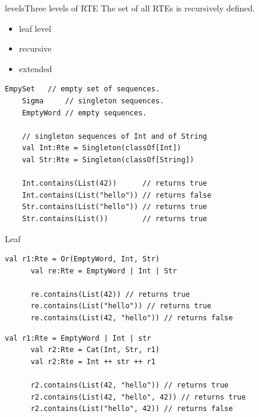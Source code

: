 \begin{frame}{levels}{Three levels of RTE}
  The set of all RTEs is recursively defined.
  \begin{itemize}
  \item leaf level
  \item recursive
  \item extended
  \end{itemize}
\end{frame}

\newsavebox\leafbox
\begin{lrbox}{\leafbox}
  \begin{minipage}{12cm}
    \begin{lstlisting}[style=scalaioScala]
    EmpySet   // empty set of sequences.
    Sigma     // singleton sequences.
    EmptyWord // empty sequences.

    // singleton sequences of Int and of String
    val Int:Rte = Singleton(classOf[Int])    
    val Str:Rte = Singleton(classOf[String])

    Int.contains(List(42))      // returns true
    Int.contains(List("hello")) // returns false
    Str.contains(List("hello")) // returns true
    Str.contains(List())        // returns true
    \end{lstlisting}
  \end{minipage}
\end{lrbox}

\begin{frame}{Leaf}
  \usebox\leafbox
\end{frame}

\newsavebox\orbox
\begin{lrbox}{\orbox}
  \begin{minipage}{12cm}
    \begin{lstlisting}[style=scalaioScala]
      val r1:Rte = Or(EmptyWord, Int, Str)
      val re:Rte = EmptyWord | Int | Str
      
      re.contains(List(42)) // returns true
      re.contains(List("hello")) // returns true
      re.contains(List(42, "hello")) // returns false

    \end{lstlisting}
  \end{minipage}
\end{lrbox}

\newsavebox\catbox
\begin{lrbox}{\catbox}
  \begin{minipage}{12cm}
    \begin{lstlisting}[style=scalaioScala]
      val r1:Rte = EmptyWord | Int | str
      val r2:Rte = Cat(Int, Str, r1)
      val r2:Rte = Int ++ str ++ r1

      r2.contains(List(42, "hello")) // returns true
      r2.contains(List(42, "hello", 42)) // returns true
      r2.contains(List("hello", 42)) // returns false
    \end{lstlisting}
  \end{minipage}
\end{lrbox}


